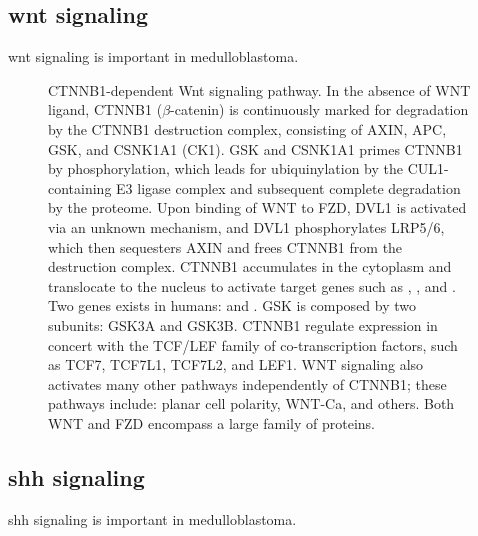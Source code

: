 \subsection{\gls{wnt} signaling}

\gls{wnt} signaling is important in medulloblastoma.

\begin{figure}[H]
	\begin{center}
	\end{center}
	\caption[CTNNB1-dependent Wnt signaling pathway]
	{
		CTNNB1-dependent Wnt signaling pathway.
		In the absence of WNT ligand, CTNNB1 ($\beta$-catenin) is continuously marked for degradation by the CTNNB1 destruction complex, consisting of AXIN, APC, GSK, and CSNK1A1 (CK1). GSK and CSNK1A1 primes CTNNB1 by phosphorylation, which leads for ubiquinylation by the CUL1-containing E3 ligase complex and subsequent complete degradation by the proteome. Upon binding of WNT to FZD, DVL1 is activated via an unknown mechanism, and DVL1 phosphorylates LRP5/6, which then sequesters AXIN and frees CTNNB1 from the destruction complex. CTNNB1 accumulates in the cytoplasm and translocate to the nucleus to activate target genes such as , , and . Two  genes exists in humans:  and . GSK is composed by two subunits: GSK3A and GSK3B. CTNNB1 regulate expression in concert with the TCF/LEF family of co-transcription factors, such as TCF7, TCF7L1, TCF7L2, and LEF1. WNT signaling also activates many other pathways independently of CTNNB1; these pathways include: planar cell polarity, WNT-Ca, and others. Both WNT and FZD encompass a large family of proteins.
	}
	\label{fig:wnt-pathway}
\end{figure}


\subsection{\gls{shh} signaling}

\gls{shh} signaling is important in medulloblastoma.

